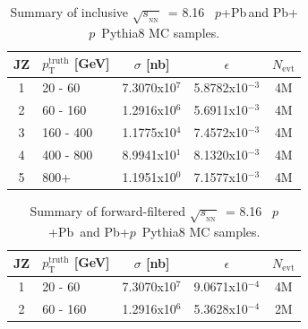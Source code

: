 \documentclass[NOTE, atlasdraft=true, texlive=2020, UKenglish]{atlasdoc}
\newcommand{\PTE}{p_{\text{T}}}
\newcommand{\SNN}{\ensuremath{\sqrt{s_{_\text{NN}}}}}
\newcommand{\pxPb}{$p$+Pb}
\newcommand{\Pbxp}{Pb+$p$}
\newcommand{\TN}[1]{ \text{#1} }
\begin{document}
\begin{table}[!ht]
\centering
\begin{tabular}{ | c | l | c | c | c |}
           \hline
           \rule{0pt}{2.25ex}  
           JZ   &  \hspace{2mm} $\PTE^{\TN{truth}}$ [GeV] & $\sigma$ [nb] & $\epsilon$ &  $N_{\TN{evt}}$ \\[0.25ex]
           \hline
           \hline
           \rule{0pt}{2.25ex} 
            1    & 20 - 60      &   7.3070x10$^7$  &  5.8782x10$^{-3}$ & 4M \\[0.1ex]
            \hline
            \rule{0pt}{2.25ex} 
            2    & 60 - 160     &  1.2916x10$^6$   &  5.6911x10$^{-3}$ & 4M \\[0.1ex]
            \hline
            \rule{0pt}{2.25ex} 
            3    & 160 - 400    &  1.1775x10$^4$   &  7.4572x10$^{-3}$ & 4M \\[0.1ex]
            \hline
            \rule{0pt}{2.25ex} 
            4    & 400 - 800    &  8.9941x10$^1$   &  8.1320x10$^{-3}$ & 4M \\[0.1ex]
            \hline
            \rule{0pt}{2.25ex} 
            5    & 800+         &  1.1951x10$^0$   &  7.1577x10$^{-3}$ & 4M \\[0.1ex]
            \hline               
        \end{tabular}
        \vspace{2mm}
        \caption{Summary of inclusive \SNN\ = 8.16 \TeV\ \pxPb\,and \Pbxp\ Pythia8 MC samples.}
        \label{tab:pPbMC}
\end{table}

\begin{table}[h]
\centering
\begin{tabular}{ | c | l | c | c | c | }
           \hline
           \rule{0pt}{2.25ex}  
           JZ   &  \hspace{2mm} $\PTE^{\TN{truth}}$ [GeV] & $\sigma$ [nb] & $\epsilon$ & $N_{\TN{evt}}$ \\[0.25ex]
           \hline
           \hline
           \rule{0pt}{2.25ex} 
            1    & 20 - 60      &   7.3070x10$^7$  &  9.0671x10$^{-4}$ & 4M \\[0.1ex]
            \hline
            \rule{0pt}{2.25ex} 
            2    & 60 - 160     &  1.2916x10$^6$   &  5.3628x10$^{-4}$ & 2M \\[0.1ex]
            \hline               
        \end{tabular}
        \vspace{2mm}
        \caption{Summary of forward-filtered \SNN\ = 8.16 \TeV\ \pxPb\ and \Pbxp\ Pythia8 MC samples. } 
        \label{tab:pPbMCFF}
\end{table}
\end{document}
